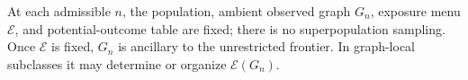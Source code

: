 At each admissible \(n\), the population, ambient observed graph \(G_n\), exposure menu \(\mathcal E\), and potential-outcome table are fixed; there is no superpopulation sampling. Once \(\mathcal E\) is fixed, \(G_n\) is ancillary to the unrestricted frontier. In graph-local subclasses it may determine or organize \(\mathcal E(G_n)\).
